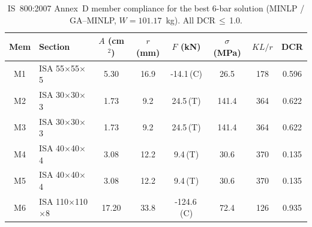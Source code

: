 \begin{table}[tbp]\centering\small
\caption{IS~800:2007 Annex~D member compliance for the best 6-bar solution (MINLP / GA--MINLP, $W=101.17$~kg). All DCR\,$\leq$\,1.0.}
\label{tab:is800_6bar}
\setlength{\tabcolsep}{4pt}
\begin{tabular}{@{}clcccccc@{}}
\toprule
Mem & Section & $A$ (cm$^2$) & $r$ (mm) & $F$ (kN) & $\sigma$ (MPa) & $KL/r$ & DCR \\
\midrule
M1 & ISA 55$\times$55$\times$5 & 5.30 & 16.9 & -14.1\,(C) & 26.5 & 178 & 0.596 \\
M2 & ISA 30$\times$30$\times$3 & 1.73 & 9.2 & 24.5\,(T) & 141.4 & 364 & 0.622 \\
M3 & ISA 30$\times$30$\times$3 & 1.73 & 9.2 & 24.5\,(T) & 141.4 & 364 & 0.622 \\
M4 & ISA 40$\times$40$\times$4 & 3.08 & 12.2 & 9.4\,(T) & 30.6 & 370 & 0.135 \\
M5 & ISA 40$\times$40$\times$4 & 3.08 & 12.2 & 9.4\,(T) & 30.6 & 370 & 0.135 \\
M6 & ISA 110$\times$110$\times$8 & 17.20 & 33.8 & -124.6\,(C) & 72.4 & 126 & 0.935 \\
\bottomrule
\end{tabular}
\end{table}
